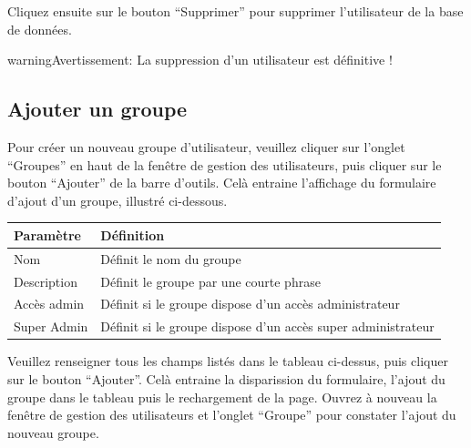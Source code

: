 \documentclass[letterpaper,10pt,french]{sphinxmanual}
\begin{document}

Cliquez ensuite sur le bouton ``Supprimer'' pour supprimer l'utilisateur de la base de données.

\begin{notice}{warning}{Avertissement:}
La suppression d'un utilisateur est définitive !
\end{notice}


\subsection{Ajouter un groupe}
\label{dashboard/usersmanagement:ajouter-un-groupe}
Pour créer un nouveau groupe d'utilisateur, veuillez cliquer sur
l'onglet ``Groupes'' en haut de la fenêtre de gestion des utilisateurs,
puis cliquer sur le bouton ``Ajouter'' de la barre d'outils. Celà
entraine l'affichage du formulaire d'ajout d'un groupe, illustré
ci-dessous.


\begin{tabulary}{\linewidth}{|L|L|}
\hline

\textbf{Paramètre}
 & 
\textbf{Définition}
\\
\hline
Nom
 & 
Définit le nom du groupe
\\
\hline
Description
 & 
Définit le groupe par une courte phrase
\\
\hline
Accès admin
 & 
Définit si le groupe dispose d'un accès administrateur
\\
\hline
Super Admin
 & 
Définit si le groupe dispose d'un accès super administrateur
\\
\hline\end{tabulary}


Veuillez renseigner tous les champs listés dans le tableau ci-dessus,
puis cliquer sur le bouton ``Ajouter''. Celà entraine la disparission du formulaire, l'ajout du groupe dans le tableau puis le rechargement de la page. Ouvrez à nouveau la fenêtre de gestion des utilisateurs et l'onglet ``Groupe'' pour constater l'ajout du nouveau groupe.
\end{document}
